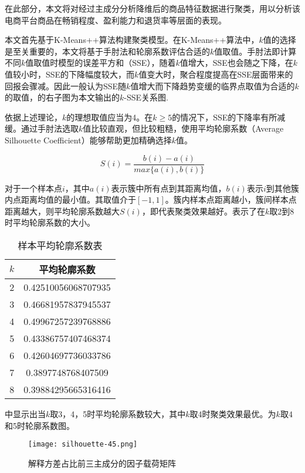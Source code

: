\documentclass[lang=cn,11pt,a4paper,cite=authoryear]{elegantpaper}
\begin{document}
在此部分，本文将对经过主成分分析降维后的商品特征数据进行聚类，用以分析该电商平台商品在畅销程度、盈利能力和退货率等层面的表现。

本文首先基于K-Means++算法构建聚类模型。在K-Means++算法中，$k$值的选择是至关重要的，本文将基于手肘法和轮廓系数评估合适的$k$值取值。手肘法即计算不同$k$值取值时模型的误差平方和（SSE），随着$k$值增大，SSE也会随之下降，在$k$值较小时，SSE的下降幅度较大，而$k$值变大时，聚合程度提高在SSE层面带来的回报会骤减。因此一般认为SSE随$k$值增大而下降趋势变缓的临界点取值为合适的$k$的取值，的右子图为本文输出的$k$-SSE关系图.

依据上述理论，$k$的理想取值应当为4。在$k \geqslant 5$的情况下，SSE的下降率有所减缓。通过手肘法选取$k$值比较直观，但比较粗糙，使用平均轮廓系数（Average Silhouette Coefficient）能够帮助更加精确选择$k$值。

\begin{equation}
  S(i) = \frac{b(i)-a(i)}{max \{a(i), b(i) \}}
\end{equation}

对于一个样本点$i$，其中$a(i)$表示簇中所有点到其距离均值，$b(i)$表示$i$到其他簇内点距离均值的最小值。其取值介于$[-1, 1]$。簇内样本点距离越小，簇间样本点距离越大，则平均轮廓系数越大$S(i)$，即代表聚类效果越好。表示了在$k$取2到8时平均轮廓系数的大小。
\begin{table}[!htb]
  \centering
  \caption{样本平均轮廓系数表}
    \huge
    \begin{tabular}{c|c}
    \hline
    \textbf{$k$} & \textbf{平均轮廓系数} \\
    \hline
    2 & 0.42510056068707935 \\
    3 & 0.46681957837945537 \\
    4 & 0.49967257239768886 \\
    5 & 0.43386757407468374 \\
    6 & 0.42604697736033786 \\
    7 & 0.3897748768407509  \\
    8 & 0.39884295665316416 \\
    \hline
    \end{tabular}
  \label{平均轮廓系数表}
\end{table}

中显示出当$k$取3，4，5时平均轮廓系数较大，其中$k$取4时聚类效果最优。为$k$取4和5时轮廓系数图。
\begin{figure}[H]
  \centering
  \texttt{[image: silhouette-45.png]}
  \caption{解释方差占比前三主成分的因子载荷矩阵}
  \label{平均轮廓系数}
\end{figure}
\end{document}
